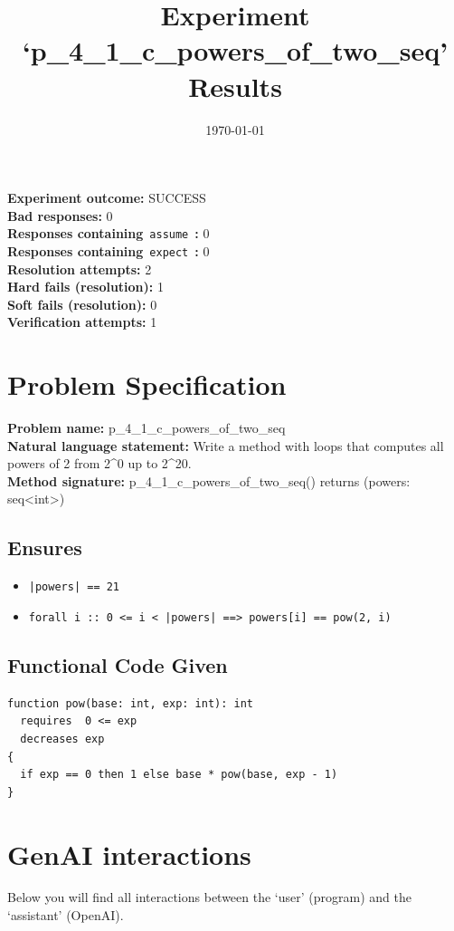 \documentclass{article}
\begin{document}
\title{Experiment `p\_4\_1\_c\_powers\_of\_two\_seq' Results}
\author{\today}
\date{}
\maketitle
\textbf{Experiment outcome: }SUCCESS
\\\textbf{Bad responses: }0
\\\textbf{Responses containing}~\texttt{assume}~\textbf{: }0
\\\textbf{Responses containing}~\texttt{expect}~\textbf{: }0
\\\textbf{Resolution attempts: }2
\\\textbf{Hard fails (resolution): }1
\\\textbf{Soft fails (resolution): }0
\\\textbf{Verification attempts: }1
\section*{Problem Specification}
\textbf{Problem name: }p\_4\_1\_c\_powers\_of\_two\_seq
\\\textbf{Natural language statement: }Write a method with loops that computes all powers of 2 from 2\^{}0 up to 2\^{}20.
\\\textbf{Method signature: }p\_4\_1\_c\_powers\_of\_two\_seq() returns (powers: seq<int>)
\subsection*{Ensures}
\begin{itemize}
\item \texttt{|powers| == 21}
\item \texttt{forall i :: 0 <= i < |powers| ==> powers[i] == pow(2, i)}
\end{itemize}
\subsection*{Functional Code Given}
\begin{lstlisting}
function pow(base: int, exp: int): int
  requires  0 <= exp
  decreases exp
{
  if exp == 0 then 1 else base * pow(base, exp - 1)
}
\end{lstlisting}
\clearpage
\section*{GenAI interactions}
Below you will find all interactions between the `user' (program) and the `assistant' (OpenAI).
\end{document}
